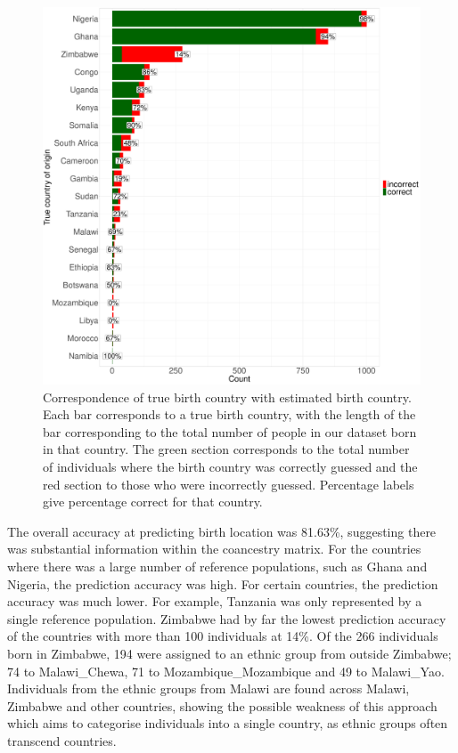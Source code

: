 \begin{figure}[htp]
    \centering
    \includegraphics[width=1.0\textwidth]{../images/chapter3/country_of_origin_allInds.pdf}
    \caption{Correspondence of true birth country with estimated birth country. Each bar corresponds to a true birth country, with the length of the bar corresponding to the total number of people in our dataset born in that country. The green section corresponds to the total number of individuals where the birth country was correctly guessed and the red section to those who were incorrectly guessed. Percentage labels give percentage correct for that country.}
    \label{fig:country_of_origin_allInds}
\end{figure}

The overall accuracy at predicting birth location was 81.63\%, suggesting there was substantial information within the coancestry matrix. For the countries where there was a large number of reference populations, such as Ghana and Nigeria, the prediction accuracy was high. For certain countries, the prediction accuracy was much lower. For example, Tanzania was only represented by a single reference population. Zimbabwe had by far the lowest prediction accuracy of the countries with more than 100 individuals at 14\%. Of the 266 individuals born in Zimbabwe, 194 were assigned to an ethnic group from outside Zimbabwe; 74 to Malawi\_Chewa, 71 to Mozambique\_Mozambique and 49 to Malawi\_Yao. Individuals from the ethnic groups from Malawi are found across Malawi, Zimbabwe and other countries, showing the possible weakness of this approach which aims to categorise individuals into a single country, as ethnic groups often transcend countries. 

